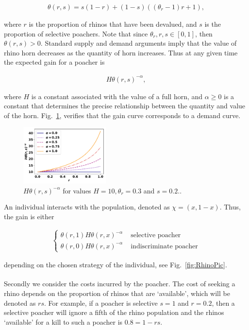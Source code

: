 \documentclass[10pt]{article}
\begin{document}
\begin{eqnarray}
	\label{eqn:theta}
	\theta(r, s) = s (1 - r) + (1 - s) ((\theta_r - 1) r + 1),
\end{eqnarray}

where \(r\) is the proportion of rhinos that have been devalued, and \(s\) is the 
proportion of selective poachers. Note that since \(\theta_r, r, s  \in [0, 1]\), then
\(\theta(r, s) > 0\). Standard supply and demand arguments imply that the value
of rhino horn decreases as the quantity of horn increases. Thus at any given time
the expected gain for a poacher is

\begin{eqnarray}
	\label{eqn:individual_gain}
	H \theta(r,s)^{-\alpha},
\end{eqnarray}

where \(H\) is a constant associated with the value of a full horn, and 
\(\alpha \geq 0\) is a constant that determines the precise relationship between
the quantity and value of the horn.  Fig.~\ref{fig:GainCurve}, verifies that the 
gain curve corresponds to a demand curve.

\begin{figure}[h]
\centering
\includegraphics[width=0.4\textwidth]{images/gain_curve.pdf}
\caption{\label{fig:GainCurve} \(H \theta(r, s) ^{- \alpha}\) for values 
\(H = 10, \theta_r = 0.3\) and \(s = 0.2.\).}
\end{figure}

An individual interacts with the population, denoted as \(\chi=(x, 1 -x )\). Thus,
the gain is either

\begin{eqnarray}
	\label{eqn:gain}
	\left\{
	\begin{array}{cl}
	\theta(r, 1) H \theta(r, x)^{-\alpha} & \mbox{ selective poacher}
	\\
	\theta(r, 0) H \theta(r, x)^{-\alpha} & \mbox{ indiscriminate poacher}
	\end{array} \right.
\end{eqnarray}

depending on the chosen strategy of the individual, see Fig.~\ref{fig:RhinoPic}.
\\
\\
Secondly we consider the costs incurred by the poacher.  The cost of seeking a 
rhino depends on the proportion of rhinos that are `available', which will be denoted
as \(rs\). For example, if a poacher is selective \(s = 1\) and \(r = 0.2\), then a 
selective poacher will ignore a fifth of the rhino population and the rhinos `available'
for a kill to such a poacher is \(0.8 = 1 - rs\).
\end{document}
